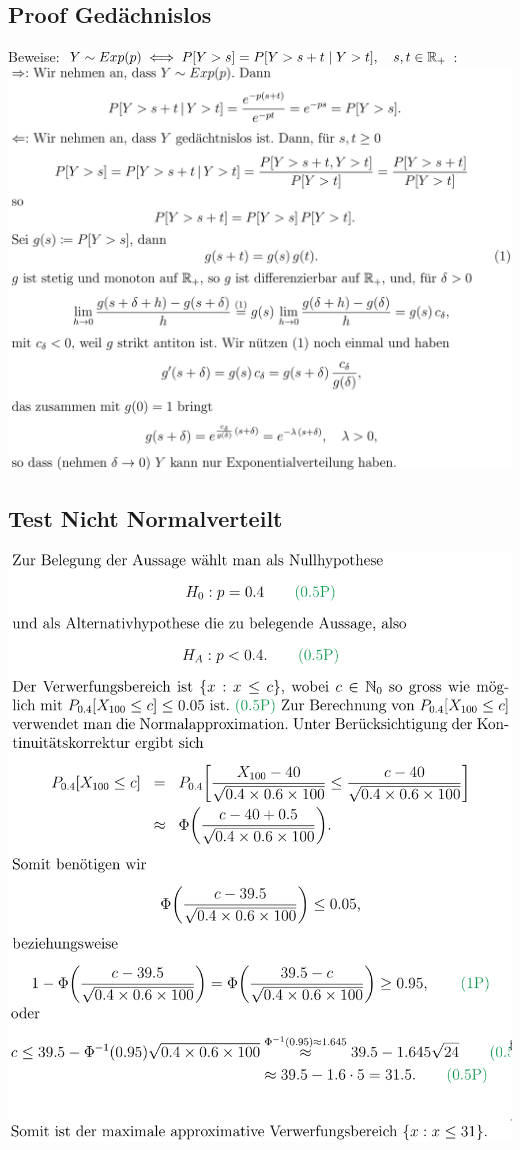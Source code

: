 \subsection{Proof Gedächnislos}
Beweise: $Y \sim Exp(p) \iff P[Y > s] = P[Y > s + t \mid Y > t], \quad s,t \in \mathbb{R}_+$:
\\ \includegraphics[width=\linewidth]{./Figures/proof_Gedaechnislos.png}

\subsection{Test Nicht Normalverteilt}
\includegraphics[width=\linewidth]{./Figures/Test_Nicht_Normalverteilt.png}

